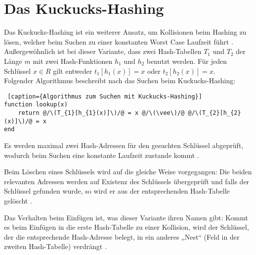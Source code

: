\section{Das Kuckucks-Hashing}\label{kuckuck}
Das Kuckucks-Hashing ist ein weiterer Ansatz, um Kollisionen beim Hashing zu lösen, welcher beim Suchen zu einer konstanten Worst Case Laufzeit führt \cite[S.~22]{ADScuckoo}. Außergewöhnlich ist bei dieser Variante, dass zwei Hash-Tabellen \(T_{1}\) und \(T_{2}\) der Länge \(m\) mit zwei Hash-Funktionen \(h_{1}\) und \(h_{2}\) benutzt werden. Für jeden Schlüssel \(x\in{R}\) gilt entweder \(t_{1}[h_{1}(x)]=x\) oder \(t_{2}[h_{2}(x)]=x\). \\ 
Folgender Algorithmus beschreibt nach \cite[S.~3]{ADScuckoo} das Suchen beim Kuckucks-Hashing:
\newpage
\begin{lstlisting} [caption={Algorithmus zum Suchen mit Kuckucks-Hashing}]
function lookup(x)
	return @/\(T_{1}[h_{1}(x)]\)/@ = x @/\(\vee\)/@ @/\(T_{2}[h_{2}(x)]\)/@ = x
end
\end{lstlisting}
Es werden maximal zwei Hash-Adressen für den gesuchten Schlüssel abgeprüft, wodurch beim Suchen eine konstante Laufzeit zustande kommt \cite[S.~3]{ADScuckoo}. 

Beim Löschen eines Schlüssels wird auf die gleiche Weise vorgegangen: Die beiden relevanten Adressen werden auf Existenz des Schlüssels übergeprüft und falls der Schlüssel gefunden wurde, so wird er aus der entsprechenden Hash-Tabelle gelöscht \cite[S.~3]{ADScuckoo}. 

Das Verhalten beim Einfügen ist, was dieser Variante ihren Namen gibt: Kommt es beim Einfügen in die erste Hash-Tabelle zu einer Kollision, wird der Schlüssel, der die entsprechende Hash-Adresse belegt, in ein anderes „Nest“ (Feld in der zweiten Hash-Tabelle) verdrängt \cite[S.~4]{ADScuckoo}. 

